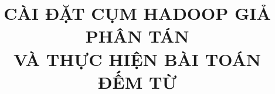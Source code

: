 \begin{titlepage}

\linespread{1.0}

\title{CÀI ĐẶT CỤM HADOOP GIẢ PHÂN TÁN\\VÀ THỰC HIỆN BÀI TOÁN ĐẾM TỪ}
\subject{CSC14118 - Nhập môn Big Data}

\fairepagedegarde

\end{titlepage}
